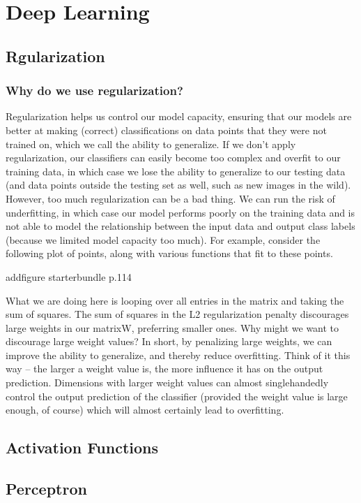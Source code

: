 \chapter{   Deep Learning}
\graphicspath{{./images/computer_vision/}}

\section{Rgularization}

\subsection{Why do we use regularization?}
Regularization helps us control our model capacity, ensuring that our models are better at
making (correct) classifications on data points that they were not trained on, which we call the
ability to generalize. If we don’t apply regularization, our classifiers can easily become too complex
and overfit to our training data, in which case we lose the ability to generalize to our testing data
(and data points outside the testing set as well, such as new images in the wild).
However, too much regularization can be a bad thing. We can run the risk of underfitting, in
which case our model performs poorly on the training data and is not able to model the relationship
between the input data and output class labels (because we limited model capacity too much). For
example, consider the following plot of points, along with various functions that fit to these points.

addfigure starterbundle p.114




What we are doing here is looping over all entries in the matrix and taking the sum of squares.
The sum of squares in the L2 regularization penalty discourages large weights in our matrixW,
preferring smaller ones. Why might we want to discourage large weight values? In short, by
penalizing large weights, we can improve the ability to generalize, and thereby reduce overfitting.
Think of it this way – the larger a weight value is, the more influence it has on the output
prediction. Dimensions with larger weight values can almost singlehandedly control the output
prediction of the classifier (provided the weight value is large enough, of course) which will almost
certainly lead to overfitting.



\section{Activation Functions}


\section{Perceptron}